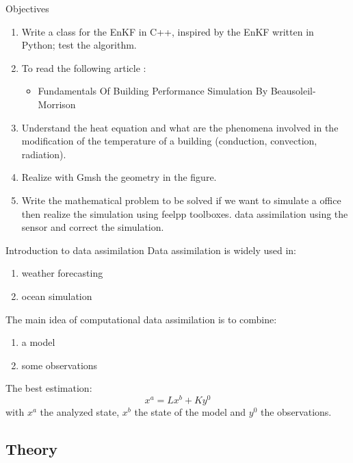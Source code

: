 
\begin{frame}[allowframebreaks]{Objectives}
		
    \begin{enumerate}[\textbullet]
        \item Write a class for the EnKF in C++, inspired by the EnKF written in Python; test the algorithm.
        \item To read the following article :
        \begin{itemize}
            \item Fundamentals Of Building Performance Simulation By Beausoleil-Morrison
        \end{itemize}
        
    \item Understand the heat equation and what are the phenomena involved in the modification of the temperature of a building (conduction, convection, radiation).
    \item Realize with Gmsh the geometry in the figure.
    \item Write the mathematical problem to be solved if we want to simulate a office then realize the simulation using feelpp toolboxes.
    \itemIntroduce data assimilation using the sensor and correct the simulation.
    \end{enumerate}
\end{frame}




\begin{frame}{Introduction to data assimilation}
Data assimilation is widely used in:
\begin{enumerate}[\textbullet]
       \item weather forecasting
       \item ocean simulation
\end{enumerate}	 
      The main idea of computational data assimilation is to combine:
\begin{enumerate}[\textbullet]
       \item a model
       \item some observations
\end{enumerate}	 
The best estimation:
$$x^a=Lx^b+Ky^0$$
with $x^a$ the analyzed state, $x^b$ the state of the model and $y^0$ the observations.
\end{frame}
\subsection{Theory}

